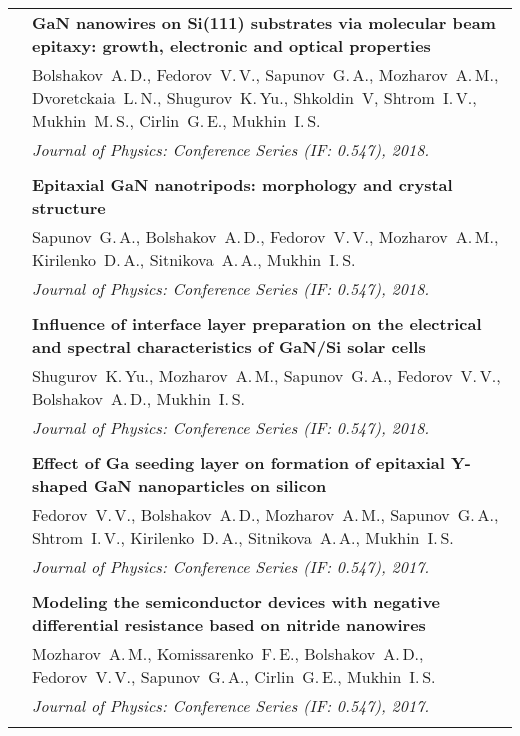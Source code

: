 \documentclass[letterpaper, 11pt]{article}
\begin{document}
\begin{longtable}{p{1.3in}p{4.8in}}
        & \textbf{GaN nanowires on Si(111) substrates via molecular beam
        epitaxy: growth, electronic and optical properties} \\
        & Bolshakov~A.\,D., Fedorov~V.\,V., Sapunov~G.\,A., Mozharov~A.\,M.,
        Dvoretckaia~L.\,N., Shugurov~K.\,Yu., Shkoldin~V, Shtrom~I.\,V.,
        Mukhin~M.\,S., Cirlin~G.\,E., Mukhin~I.\,S. \\
		& \textit{Journal of Physics: Conference Series (IF: 0.547), 2018.}\\
		& \\
		
        & \textbf{Epitaxial GaN nanotripods: morphology and crystal structure}
        \\
        & Sapunov~G.\,A., Bolshakov~A.\,D., Fedorov~V.\,V.,  Mozharov~A.\,M.,
        Kirilenko~D.\,A., Sitnikova~A.\,A., Mukhin~I.\,S. \\
		& \textit{Journal of Physics: Conference Series (IF: 0.547), 2018.}\\
		& \\
		
        & \textbf{Influence of interface layer preparation on the electrical
        and spectral characteristics of GaN/Si solar cells} \\
        & Shugurov~K.\,Yu., Mozharov~A.\,M., Sapunov~G.\,A., Fedorov~V.\,V.,
        Bolshakov~A.\,D., Mukhin~I.\,S. \\
		& \textit{Journal of Physics: Conference Series (IF: 0.547), 2018.}\\
		& \\
		
        & \textbf{Effect of Ga seeding layer on formation of epitaxial Y-shaped
        GaN nanoparticles on silicon} \\
        & Fedorov~V.\,V., Bolshakov~A.\,D., Mozharov~A.\,M., Sapunov~G.\,A.,
        Shtrom~I.\,V., Kirilenko~D.\,A., Sitnikova~A.\,A., Mukhin~I.\,S. \\
        & \textit{Journal of Physics: Conference Series (IF: 0.547), 2017.}\\
		& \\

        & \textbf{Modeling the semiconductor devices with negative differential
        resistance based on nitride nanowires} \\
        & Mozharov~A.\,M., Komissarenko~F.\,E., Bolshakov~A.\,D.,
        Fedorov~V.\,V., Sapunov~G.\,A., Cirlin~G.\,E., Mukhin~I.\,S. \\
		& \textit{Journal of Physics: Conference Series (IF: 0.547), 2017.}\\
		& \\


\end{longtable}
\end{document}

